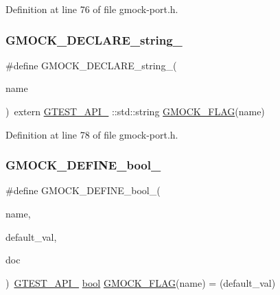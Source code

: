 Definition at line 76 of file gmock-\/port.\+h.

\mbox{\label{gmock-port_8h_a35af08c45131cf68d78446cb8cfe40fe}} 
\subsubsection{\texorpdfstring{G\+M\+O\+C\+K\+\_\+\+D\+E\+C\+L\+A\+R\+E\+\_\+string\+\_\+}{GMOCK\_DECLARE\_string\_}}
{\footnotesize\ttfamily \#define G\+M\+O\+C\+K\+\_\+\+D\+E\+C\+L\+A\+R\+E\+\_\+string\+\_\+(\begin{DoxyParamCaption}\item[{}]{name }\end{DoxyParamCaption})~extern \hyperlink{gtest-port_8h_aa73be6f0ba4a7456180a94904ce17790}{G\+T\+E\+S\+T\+\_\+\+A\+P\+I\+\_\+} \+::std\+::string \hyperlink{gmock-port_8h_ad7119adfef06be5e7b1551633f5a1436}{G\+M\+O\+C\+K\+\_\+\+F\+L\+AG}(name)}



Definition at line 78 of file gmock-\/port.\+h.

\mbox{\label{gmock-port_8h_a470be328fabbeef3987127adc18a1433}} 
\subsubsection{\texorpdfstring{G\+M\+O\+C\+K\+\_\+\+D\+E\+F\+I\+N\+E\+\_\+bool\+\_\+}{GMOCK\_DEFINE\_bool\_}}
{\footnotesize\ttfamily \#define G\+M\+O\+C\+K\+\_\+\+D\+E\+F\+I\+N\+E\+\_\+bool\+\_\+(\begin{DoxyParamCaption}\item[{}]{name,  }\item[{}]{default\+\_\+val,  }\item[{}]{doc }\end{DoxyParamCaption})~\hyperlink{gtest-port_8h_aa73be6f0ba4a7456180a94904ce17790}{G\+T\+E\+S\+T\+\_\+\+A\+P\+I\+\_\+} \hyperlink{classbool}{bool} \hyperlink{gmock-port_8h_ad7119adfef06be5e7b1551633f5a1436}{G\+M\+O\+C\+K\+\_\+\+F\+L\+AG}(name) = (default\+\_\+val)}



